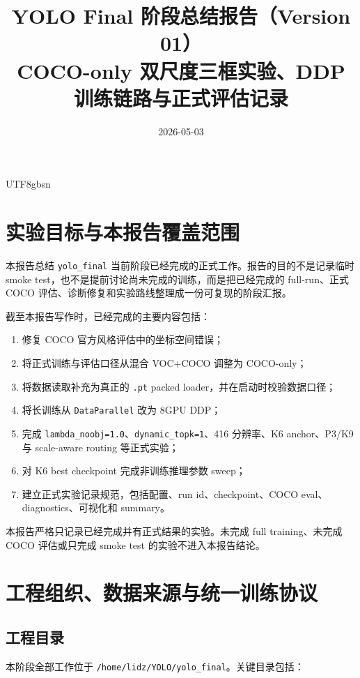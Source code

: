 \documentclass[11pt,a4paper]{article}
\title{YOLO Final 阶段总结报告（Version 01）\\COCO-only 双尺度三框实验、DDP 训练链路与正式评估记录}
\author{}
\date{2026-05-03}
\begin{document}
\begin{CJK*}{UTF8}{gbsn}

\maketitle
\tableofcontents
\newpage

\section{实验目标与本报告覆盖范围}

本报告总结 \texttt{yolo\_final} 当前阶段已经完成的正式工作。报告的目的不是记录临时 smoke test，也不是提前讨论尚未完成的训练，而是把已经完成的 full-run、正式 COCO 评估、诊断修复和实验路线整理成一份可复现的阶段汇报。

截至本报告写作时，已经完成的主要内容包括：

\begin{enumerate}[label=\arabic*.]
  \item 修复 COCO 官方风格评估中的坐标空间错误；
  \item 将正式训练与评估口径从混合 VOC+COCO 调整为 COCO-only；
  \item 将数据读取补充为真正的 \texttt{.pt} packed loader，并在启动时校验数据口径；
  \item 将长训练从 \texttt{DataParallel} 改为 8GPU DDP；
  \item 完成 \texttt{lambda\_noobj=1.0}、\texttt{dynamic\_topk=1}、416 分辨率、K6 anchor、P3/K9 与 scale-aware routing 等正式实验；
  \item 对 K6 best checkpoint 完成非训练推理参数 sweep；
  \item 建立正式实验记录规范，包括配置、run id、checkpoint、COCO eval、diagnostics、可视化和 summary。
\end{enumerate}

本报告严格只记录已经完成并有正式结果的实验。未完成 full training、未完成 COCO 评估或只完成 smoke test 的实验不进入本报告结论。

\section{工程组织、数据来源与统一训练协议}

\subsection{工程目录}

本阶段全部工作位于 \texttt{/home/lidz/YOLO/yolo\_final}。关键目录包括：


\end{CJK*}
\end{document}
